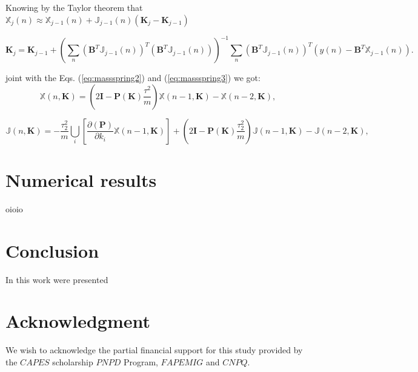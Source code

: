 \documentclass[review]{elsarticle}
\begin{document}
Knowing by the Taylor theorem that 
$\mathbb{X}_{j}(n) \approx \mathbb{X}_{j-1}(n) + \mathbb{J}_{j-1}(n)\left( \mathbf{K}_{j} - \mathbf{K}_{j-1}\right) $

\begin{equation}\label{eq:miniterative2}
\mathbf{K}_{j} = \mathbf{K}_{j-1} +
\left(\sum_{n}{ \left( \mathbf{B}^{T}\mathbb{J}_{j-1}(n)\right)^{T}\left(  \mathbf{B}^{T}\mathbb{J}_{j-1}(n) \right) }\right)^{-1} 
\sum_{n}{ \left( \mathbf{B}^{T}\mathbb{J}_{j-1}(n)\right)^{T} \left(y(n) - \mathbf{B}^{T}\mathbb{X}_{j-1}(n) \right) }.
\end{equation}

joint with the Eqs. (\ref{eq:massspring2}) and (\ref{eq:massspring3}) we got:
\begin{equation}\label{eq:massspring2b}
 \mathbb{X}(n,\mathbf{K}) = \left(2 \mathbf{I} -\mathbf{P(\mathbf{K})}\frac{\tau^2}{m}\right) \mathbb{X}(n-1,\mathbf{K})-\mathbb{X}(n-2,\mathbf{K}),
\end{equation}

\begin{equation}\label{eq:massspring3b}
 \mathbb{J}(n,\mathbf{K}) = 
 -\frac{\tau_2^2}{m}\bigcup_{i}{ \left[ \frac{ \partial\left(\mathbf{P}\right)}{\partial k_{i}}  \mathbb{X}(n-1,\mathbf{K})\right] }
 +\left(2 \mathbf{I} -\mathbf{P(\mathbf{K})}\frac{\tau_2^2}{m}\right) \mathbb{J}(n-1,\mathbf{K})
 -\mathbb{J}(n-2,\mathbf{K}),
\end{equation}
\section{Numerical results} 
\label{sec:numerical}
oioio


\section{Conclusion} 

In this work were presented

\section{Acknowledgment}
We wish to acknowledge the partial financial support for this study provided by the $CAPES$ 
scholarship
$PNPD$ Program, $FAPEMIG$ and $CNPQ$.
\end{document}
